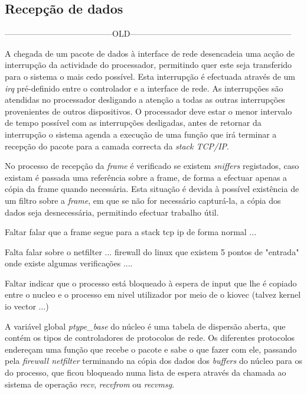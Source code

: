 \subsection{Recepção de dados}

---------------------------------------OLD-----------------------------------------------------------

A chegada de um pacote de dados à interface de rede desencadeia uma acção de interrupção da actividade do processador, permitindo quer este seja transferido para o sistema o mais cedo possível.
Esta interrupção é efectuada através de um \textit{irq} pré-definido entre o controlador e a interface de rede. As interrupções são atendidas no processador desligando a atenção a todas as outras interrupções provenientes de outros dispositivos. %
O processador deve estar o menor intervalo de tempo possível com as interrupções desligadas, antes de retornar da interrupção o sistema agenda a execução de uma função que irá terminar a recepção do pacote para a camada correcta da \textit{stack TCP/IP}.%

No processo de recepção da \textit{frame} é verificado se existem \textit{sniffers} registados, caso existam é passada uma referência sobre a frame, de forma a efectuar apenas a cópia da frame quando necessária.
Esta situação é devida à possível existência de um filtro sobre a \textit{frame}, em que se não for necessário capturá-la, a cópia dos dados seja desnecessária, permitindo efectuar trabalho útil.

Faltar falar que a frame segue para a stack tcp ip de forma normal ...

Falta falar sobre o netfilter ... firewall do linux que existem 5 pontos de "entrada" onde existe algumas verificações .... 

Faltar indicar que o processo está bloqueado à espera de input que lhe é copiado entre o nucleo e o processo em nivel utilizador por meio de o kiovec (talvez kernel io vector ...) 


A variável global \textit{ptype\_base} do núcleo é uma tabela de dispersão aberta, que contém os tipos de controladores de protocolos de rede. Os diferentes protocolos endereçam uma função que recebe o pacote e sabe o que fazer com ele, passando pela \textit{firewall netfilter} terminando na cópia dos dados dos \textit{buffers} do núcleo para os do processo, que ficou bloqueado numa lista de espera através da chamada ao sistema de operação \textit{recv}, \textit{recvfrom} ou \textit{recvmsg}.


